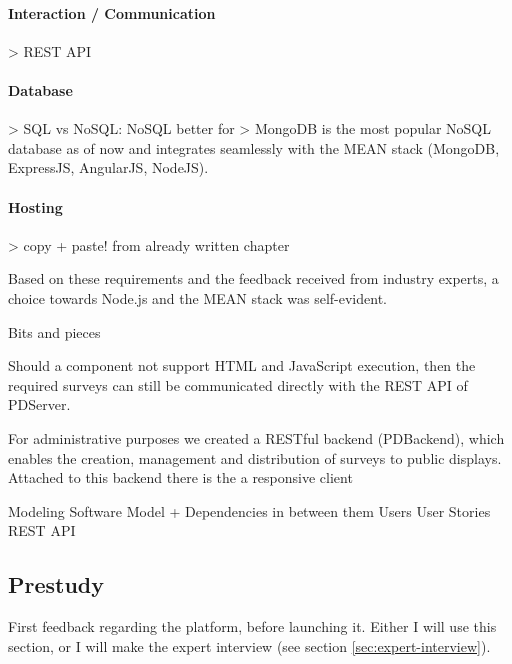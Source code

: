 	\paragraph{Interaction / Communication}
	
		> REST API


	\paragraph{Database}
		> SQL vs NoSQL: NoSQL better for 
		> MongoDB is the most popular NoSQL database as of now and integrates seamlessly with the MEAN stack (MongoDB, ExpressJS, AngularJS, NodeJS).

	\paragraph{Hosting}
		 > copy + paste! from already written chapter




	Based on these requirements and the feedback received from industry experts, a choice towards Node.js and the MEAN stack was self-evident.



Bits and pieces

		Should a component not support HTML and JavaScript execution, then the required surveys can still be communicated directly with the REST API of PDServer.

		For administrative purposes we created a RESTful backend (PDBackend), which enables the creation, management and distribution of surveys to public displays. Attached to this backend there is the   a responsive client 









\clearpage

\label{sec:implementation:modeling}

Modeling
	Software Model
	+ Dependencies in between them
	Users
	User Stories
	REST API



\subsection{Prestudy}

First feedback regarding the platform, before launching it. Either I will use this section, or I will make the expert interview (see section \ref{sec:expert-interview}).



